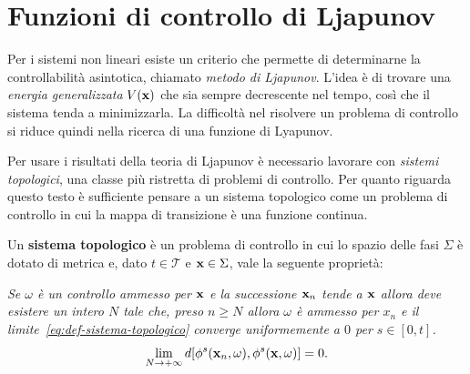 \section{Funzioni di controllo di Ljapunov}
Per i sistemi non lineari esiste un criterio che permette di determinarne
la controllabilità asintotica, chiamato \emph{metodo di Ljapunov}.
L'idea è di trovare una \emph{energia generalizzata} $V(\mathbf{x})$
che sia sempre decrescente nel tempo,
così che il sistema tenda a minimizzarla.
La difficoltà nel risolvere un problema di controllo si riduce quindi
nella ricerca di una funzione di Lyapunov.

Per usare i risultati della teoria di Ljapunov è necessario lavorare
con \emph{sistemi topologici}, una classe più ristretta di problemi di controllo.
Per quanto riguarda questo testo è sufficiente pensare a un sistema topologico
come un problema di controllo in cui la mappa di transizione è una funzione
continua.

\begin{definition}
    Un \textbf{sistema topologico} è un problema di controllo in
    cui lo spazio delle fasi $\Sigma$ è dotato di metrica e,
    dato $t \in \mathcal T$ e $\mathbf{x} \in \Sigma$,
    vale la seguente proprietà:

    \emph{Se $\omega$ è un controllo ammesso per $\mathbf{x}$ e la successione
    ${\mathbf{x}_n}$ tende a $\mathbf{x}$ allora deve esistere un intero
    $N$ tale che, preso $n \geq N$ allora $\omega$ è ammesso per $x_n$
    e il limite~\eqref{eq:def-sistema-topologico} converge uniformemente a $0$ per $s \in [0, t]$.}
    \begin{equation}
        \lim_{N \to +\infty} d[\phi^s(\mathbf{x}_n, \omega), \phi^s(\mathbf{x}, \omega)] = 0.
        \label{eq:def-sistema-topologico}
    \end{equation}
\end{definition}


